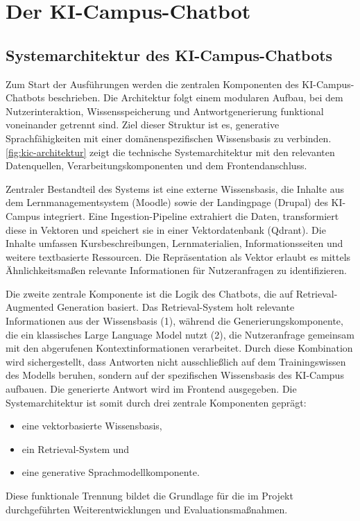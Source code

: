 \chapter{Der KI-Campus-Chatbot}
\label{sec:kic}

\section{Systemarchitektur des KI-Campus-Chatbots}

Zum Start der Ausführungen werden die zentralen Komponenten des KI-Campus-Chatbots beschrieben. Die Architektur folgt einem modularen Aufbau, bei dem Nutzerinteraktion, Wissensspeicherung und Antwortgenerierung funktional voneinander getrennt sind. Ziel dieser Struktur ist es, generative Sprachfähigkeiten mit einer domänenspezifischen Wissensbasis zu verbinden. \autoref{fig:kic-architektur} zeigt die technische Systemarchitektur mit den relevanten Datenquellen, Verarbeitungskomponenten und dem Frontendanschluss.

Zentraler Bestandteil des Systems ist eine externe Wissensbasis, die Inhalte aus dem Lernmanagementsystem (Moodle) sowie der Landingpage (Drupal) des KI-Campus integriert. Eine Ingestion-Pipeline extrahiert die Daten, transformiert diese in Vektoren und speichert sie in einer Vektordatenbank (Qdrant). Die Inhalte umfassen Kursbeschreibungen, Lernmaterialien, Informationsseiten und weitere textbasierte Ressourcen. Die Repräsentation als Vektor erlaubt es mittels Ähnlichkeitsmaßen relevante Informationen für Nutzeranfragen zu identifizieren.

Die zweite zentrale Komponente ist die Logik des Chatbots, die auf Retrieval-Augmented Generation basiert. Das Retrieval-System holt relevante Informationen aus der Wissensbasis (1), während die Generierungskomponente, die ein klassisches Large Language Model nutzt (2), die Nutzeranfrage gemeinsam mit den abgerufenen Kontextinformationen verarbeitet. Durch diese Kombination wird sichergestellt, dass Antworten nicht ausschließlich auf dem Trainingswissen des Modells beruhen, sondern auf der spezifischen Wissensbasis des KI-Campus aufbauen. Die generierte Antwort wird im Frontend ausgegeben. Die Systemarchitektur ist somit durch drei zentrale Komponenten geprägt:
\begin{itemize}
    \item eine vektorbasierte Wissensbasis,
    \item ein Retrieval-System und
    \item eine generative Sprachmodellkomponente.
\end{itemize}
Diese funktionale Trennung bildet die Grundlage für die im Projekt durchgeführten Weiterentwicklungen und Evaluationsmaßnahmen.

